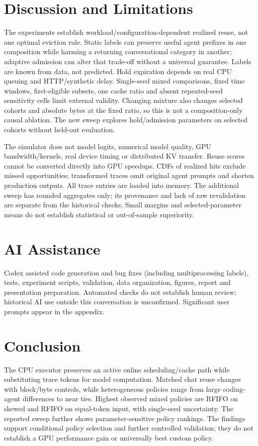 \documentclass{article}
\begin{document}
\section{Discussion and Limitations}
The experiments establish workload/configuration-dependent realized reuse, not one optimal eviction rule. Static labels can preserve useful agent prefixes in one composition while harming a returning conversational category in another; adaptive admission can alter that trade-off without a universal guarantee. Labels are known from data, not predicted. Hold expiration depends on real CPU queuing and HTTP/synthetic delay. Single-seed mixed comparisons, fixed time windows, first-eligible subsets, one cache ratio and absent repeated-seed sensitivity cells limit external validity. Changing mixture also changes selected cohorts and absolute bytes at the fixed ratio, so this is not a composition-only causal ablation. The new sweep explores hold/admission parameters on selected cohorts without held-out evaluation.

The simulator does not model logits, numerical model quality, GPU bandwidth/kernels, real device timing or distributed KV transfer. Reuse scores cannot be converted directly into GPU speedups. CDFs of realized hits exclude missed opportunities; transformed traces omit original agent prompts and shorten production outputs. All trace entries are loaded into memory. The additional sweep has rounded aggregates only; its provenance and lack of raw revalidation are separate from the historical checks. Small margins and selected-parameter means do not establish statistical or out-of-sample superiority.

\section{AI Assistance}
Codex assisted code generation and bug fixes (including multiprocessing labels), tests, experiment scripts, validation, data organization, figures, report and presentation preparation. Automated checks do not establish human review; historical AI use outside this conversation is unconfirmed. Significant user prompts appear in the appendix.

\newpage
\section{Conclusion}
The CPU executor preserves an active online scheduling/cache path while substituting trace tokens for model computation. Matched chat reuse changes with block/byte controls, while heterogeneous policies range from large coding-agent differences to near ties. Highest observed mixed policies are RFIFO on skewed and RFIFO on equal-token input, with single-seed uncertainty. The reported sweep further shows parameter-sensitive policy rankings. The findings support conditional policy selection and further controlled validation; they do not establish a GPU performance gain or universally best custom policy.
\end{document}
